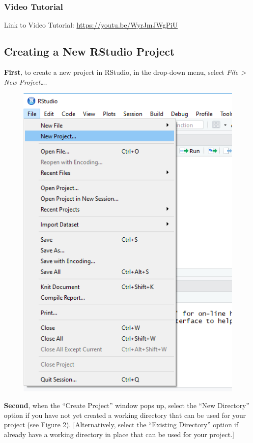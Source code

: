 \documentclass[]{book}
\begin{document}
\subsubsection{Video Tutorial}\label{video-tutorial-3}

Link to Video Tutorial: \url{https://youtu.be/WyrJmJWgPiU}

\subsection{Creating a New RStudio
Project}\label{creating-a-new-rstudio-project}

\textbf{First}, to create a new project in RStudio, in the drop-down
menu, select \emph{File \textgreater{} New Project\ldots{}}.

\begin{figure}
\centering
\includegraphics{Create R Project.png}
\caption{}
\end{figure}

\textbf{Second}, when the ``Create Project'' window pops up, select the
``New Directory'' option if you have not yet created a working directory
that can be used for your project (see Figure 2). {[}Alternatively,
select the ``Existing Directory'' option if already have a working
directory in place that can be used for your project.{]}
\end{document}
